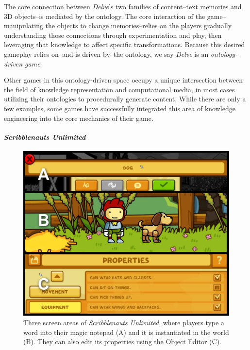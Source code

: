 The core connection between \textit{Delve}'s two families of content--text memories and 3D objects--is mediated by the ontology. The core interaction of the game--manipulating the objects to change memories--relies on the players gradually understanding those connections through experimentation and play, then leveraging that knowledge to affect specific transformations. Because this desired gameplay relies on--and is driven by--the ontology, we say \textit{Delve} is an \textit{ontology-driven game}.

Other games in this ontology-driven space occupy a unique intersection between the field of knowledge representation and computational media, in most cases utilizing their ontologies to procedurally generate content. While there are only a few examples, some games have successfully integrated this area of knowledge engineering into the core mechanics of their game.

\paragraph{\textit{Scribblenauts Unlimited}}\label{par:scribblenauts-unlimited}


\begin{figure}
    \centering
    \includegraphics[width=\textwidth]{figures/4-Delve/scribblenauts.png}
    \caption{Three screen areas of \textit{Scribblenauts Unlimited}, where players type a word into their magic notepad (A) and it is instantiated in the world (B). They can also edit its properties using the Object Editor (C).}
    \label{fig:scribblenauts}
\end{figure}

